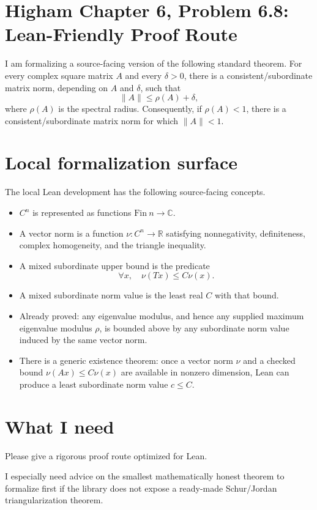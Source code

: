 \documentclass{article}
\begin{document}
\section*{Higham Chapter 6, Problem 6.8: Lean-Friendly Proof Route}

I am formalizing a source-facing version of the following standard theorem.
For every complex square matrix \(A\) and every \(\delta>0\), there is a
consistent/subordinate matrix norm, depending on \(A\) and \(\delta\), such
that
\[
  \|A\| \le \rho(A)+\delta,
\]
where \(\rho(A)\) is the spectral radius.  Consequently, if \(\rho(A)<1\),
there is a consistent/subordinate matrix norm for which \(\|A\|<1\).

\section*{Local formalization surface}

The local Lean development has the following source-facing concepts.

\begin{itemize}
\item \(C^n\) is represented as functions \(\mathrm{Fin}\ n \to \mathbb C\).
\item A vector norm is a function \(\nu:C^n\to\mathbb R\) satisfying
  nonnegativity, definiteness, complex homogeneity, and the triangle
  inequality.
\item A mixed subordinate upper bound is the predicate
  \[
    \forall x,\quad \nu(Tx)\le C\nu(x).
  \]
\item A mixed subordinate norm value is the least real \(C\) with that
  bound.
\item Already proved: any eigenvalue modulus, and hence any supplied maximum
  eigenvalue modulus \(\rho\), is bounded above by any subordinate norm value
  induced by the same vector norm.
\item There is a generic existence theorem: once a vector norm \(\nu\) and a
  checked bound \(\nu(Ax)\le C\nu(x)\) are available in nonzero dimension,
  Lean can produce a least subordinate norm value \(c\le C\).
\end{itemize}

\section*{What I need}

Please give a rigorous proof route optimized for Lean.

I especially need advice on the smallest mathematically honest theorem to
formalize first if the library does not expose a ready-made Schur/Jordan
triangularization theorem.
\end{document}
